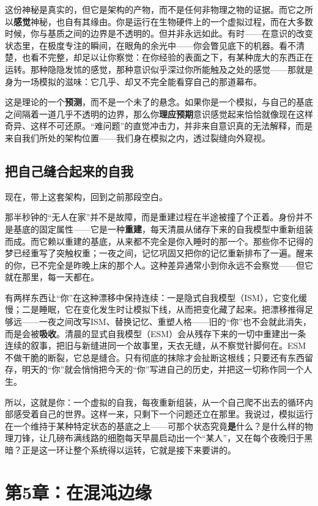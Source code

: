 \documentclass[11pt, twoside, openright]{book}
\begin{document}
这份神秘是真实的，但它是架构的产物，而不是任何非物理之物的证据。而它之所以\textbf{感觉}神秘，也自有其缘由。你是运行在生物硬件上的一个虚拟过程，而在大多数时候，你与基质之间的边界是不透明的。但并非永远如此。有时------在意识的改变状态里，在极度专注的瞬间，在眼角的余光中------你会瞥见底下的机器。看不清楚，也看不完整，却足以让你察觉：在你经验的表面之下，有某种庞大的东西正在运转。那种隐隐发怵的感觉，那种意识似乎深过你所能触及之处的感觉------那就是身为一场模拟的滋味：它几乎、却又不完全能看穿自己的那道幕布。

这是理论的一个\textbf{预测}，而不是一个未了的悬念。如果你是一个模拟，与自己的基底之间隔着一道几乎不透明的边界，那么你\textbf{理应预期}意识感觉起来恰恰就像现在这样奇异、这样不可还原。“难问题”的直觉冲击力，并非来自意识真的无法解释，而是来自我们所处的架构位置------我们身在模拟之内，透过裂缝向外窥视。

\section*{把自己缝合起来的自我}

现在，带上这套架构，回到之前那段空白。

那半秒钟的“无人在家”并不是故障，而是重建过程在半途被撞了个正着。身份并不是基底的固定属性------它是一种\textbf{重建}，每天清晨从储存下来的自我模型中重新组装而成。而它赖以重建的基底，从来都不完全是你入睡时的那一个。那些你不记得的梦已经重写了突触权重；一夜之间，记忆巩固又把你的记忆重新排布了一遍。醒来的你，已不完全是昨晚上床的那个人。这种差异通常小到你永远不会察觉------但它就在那里，每一天都在。

有两样东西让“你”在这种漂移中保持连续：一是隐式自我模型（ISM），它变化缓慢；二是睡眠，它在变化发生时让模拟下线，从而把变化藏了起来。把漂移推得足够远------一夜之间改写ISM、替换记忆、重塑人格------旧的“你”也不会就此消失，而是会被\textbf{吸收}。清晨的显式自我模型（ESM）会从残存下来的一切中重建出一条连续的叙事，把旧与新缝进同一个故事里，天衣无缝，从不察觉针脚何在。ESM不做干脆的断裂，它总是缝合。只有彻底的抹除才会扯断这根线；只要还有东西留存，明天的“你”就会悄悄把今天的“你”写进自己的历史，并把这一切称作同一个人生。

所以，这就是你：一个虚拟的自我，每夜重新组装，从一个自己爬不出去的循环内部感受着自己的世界。这样一来，只剩下一个问题还立在那里。我说过，模拟运行在一个维持于某种特定状态的基底之上------可那个状态究竟\textbf{是}什么？是什么样的物理刀锋，让几磅布满线路的细胞每天早晨启动出一个“某人”，又在每个夜晚归于黑暗？正是这一环让整个系统得以运转，它就是接下来要讲的。


\chapter*{第5章：在混沌边缘}
\end{document}
